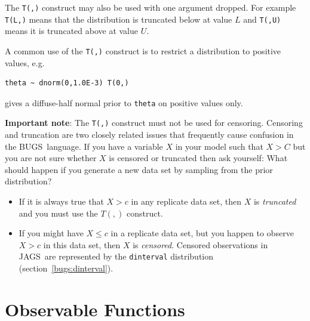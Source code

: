 \documentclass[11pt, a4paper, titlepage]{report}
\newcommand{\JAGS}{\textsf{JAGS}}
\newcommand{\BUGS}{\textsf{BUGS}}
\begin{document}
The \texttt{T(,)} construct may also be used with one argument
dropped.  For example \texttt{T(L,)} means that the distribution is
truncated below at value $L$ and \texttt{T(,U)} means it is truncated
above at value $U$.

A common use of the \texttt{T(,)} construct is to restrict a
distribution to positive values, e.g.
\begin{verbatim}
theta ~ dnorm(0,1.0E-3) T(0,)
\end{verbatim}
gives a diffuse-half normal prior to \texttt{theta} on positive values
only.

{\bf Important note}: The \texttt{T(,)} construct must not be used for
censoring. Censoring and truncation are two closely related issues
that frequently cause confusion in the \BUGS\ language. If you have a
variable $X$ in your model such that $X > C$ but you are not sure
whether $X$ is censored or truncated then ask yourself: What should
happen if you generate a new data set by sampling from the prior
distribution? 
\begin{itemize}
\item If it is always true that $X > c$ in any replicate data set,
  then $X$ is {\em truncated} and you must use the $T(,)$ construct.
\item If you might have $X \leq c$ in a replicate data set, but you
  happen to observe $X > c$ in this data set, then $X$ is {\em
    censored}. Censored observations in \JAGS\ are represented by the
  \texttt{dinterval} distribution (section~\ref{bugs:dinterval}).
\end{itemize}

\section{Observable Functions}
\label{section:obfun}
\end{document}
